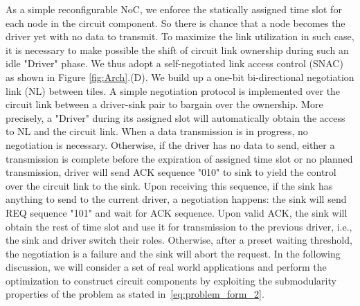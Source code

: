 {{As a simple reconfigurable NoC, we enforce the statically assigned time slot for each node in the circuit component. So there is chance that a node becomes the driver yet with no data to transmit. To maximize the link utilization in such case,  it is necessary to make possible the shift of circuit link ownership during such an idle "Driver" phase.  We thus adopt a self-negotiated link access control (SNAC) as shown in Figure \ref{fig:Arch}.(D). We build up a one-bit bi-directional negotiation link (NL) between tiles. A simple negotiation protocol is implemented over the circuit link between a driver-sink pair to bargain over the ownership. More precisely, a "Driver" during its assigned slot will automatically obtain the access to NL and the circuit link. When a data transmission is in progress, no negotiation is necessary. Otherwise, if the driver has no data to send, either a transmission is complete before the expiration of assigned time slot or no planned transmission, driver will send ACK sequence "010" to sink to yield the control over the circuit link to the sink. Upon receiving this sequence, if the sink has anything to send to the current driver, a negotiation happens: the sink will send REQ sequence "101" and wait for ACK sequence. Upon valid ACK, the sink will obtain the rest of time slot and use it for transmission to the previous driver, i.e., the sink and driver switch their roles.  Otherwise, after a preset waiting threshold, the negotiation is a failure and the sink will abort the request. In the following discussion, we will consider a set of real world applications and perform the optimization to construct circuit components by exploiting the submodularity properties of the problem as stated in~\eqref{eq:problem_form_2}.
}}
